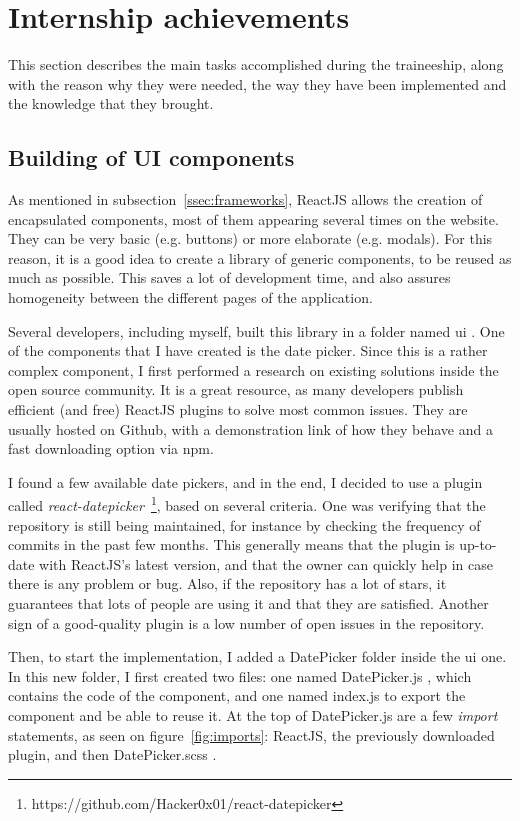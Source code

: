 \section{Internship achievements}
\label{sec:accomplish}

This section describes the main tasks accomplished during the traineeship, along with the reason why they were needed, the way they have been implemented and the knowledge that they brought.

\subsection{Building of UI components}
\label{ssec:ui_components}

As mentioned in {\sc subsection}~\ref{ssec:frameworks}, ReactJS allows the creation of encapsulated components, most of them appearing several times on the website. They can be very basic (e.g. buttons) or more elaborate (e.g. modals). For this reason, it is a good idea to create a library of generic components, to be reused as much as possible. This saves a lot of development time, and also assures homogeneity between the different pages of the application.

Several developers, including myself, built this library in a folder named \guillemotleft{} ui \guillemotright{}. One of the components that I have created is the date picker. Since this is a rather complex component, I first performed a research on existing solutions inside the open source community. It is a great resource, as many developers publish efficient (and free) ReactJS plugins to solve most common issues. They are usually hosted on Github, with a demonstration link of how they behave and a fast downloading option via npm.

I found a few available date pickers, and in the end, I decided to use a plugin called \textit{react-datepicker}~\footnote{https://github.com/Hacker0x01/react-datepicker}, based on several criteria. One was verifying that the repository is still being maintained, for instance by checking the frequency of commits in the past few months. This generally means that the plugin is up-to-date with ReactJS's latest version, and that the owner can quickly help in case there is any problem or bug. Also, if the repository has a lot of stars, it guarantees that lots of people are using it and that they are satisfied. Another sign of a good-quality plugin is a low number of open issues in the repository. 

Then, to start the implementation, I added a \guillemotleft{} DatePicker \guillemotright{} folder inside the ui one. In this new folder, I first created two files: one named \guillemotleft{} DatePicker.js \guillemotright{}, which contains the code of the component, and one named \guillemotleft{} index.js \guillemotright{} to export the component and be able to reuse it. At the top of DatePicker.js are a few \textit{import} statements, as seen on {\sc figure}~\ref{fig:imports}: ReactJS, the previously downloaded plugin, and then \guillemotleft{} DatePicker.scss \guillemotright{}.

